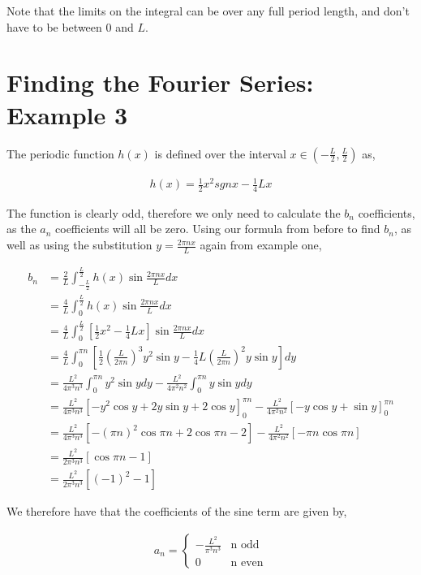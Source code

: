 \documentclass[11pt]{amsart}
\begin{document}
Note that the limits on the integral can be over any full period length, and don't have to be between $0$ and $L$.


\section{Finding the Fourier Series: Example 3}

The periodic function $h(x)$ is defined over the interval $x \in (-\frac{L}{2},\frac{L}{2})$ as,

\begin{align*}
  h(x) = \frac{1}{2}x^2 sgn{x} - \frac{1}{4}Lx
\end{align*}

The function is clearly odd, therefore we only need to calculate the $b_n$ coefficients, as the $a_n$ coefficients will all be zero. Using our formula from before to find $b_n$, as well as using the substitution $y = \frac{2\pi nx}{L}$ again from example one,

\begin{align*}
  b_n &= \frac{2}{L}\int_{-\frac{L}{2}}^{\frac{L}{2}}h(x)\sin{\frac{2\pi nx}{L}} dx \\
      &= \frac{4}{L}\int_0^{\frac{L}{2}}h(x)\sin{\frac{2\pi nx}{L}} dx \\
      &= \frac{4}{L}\int_0^{\frac{L}{2}}\left[\frac{1}{2}x^2-\frac{1}{4}Lx\right]\sin{\frac{2\pi nx}{L}} dx \\
      &= \frac{4}{L}\int_0^{\pi n}\left[\frac{1}{2}{\left(\frac{L}{2\pi n}\right)}^3y^2\sin{y}-\frac{1}{4}L{\left(\frac{L}{2\pi n}\right)}^2y\sin{y}\right] dy \\
      &= \frac{L^2}{4\pi^3n^3}\int_0^{\pi n}y^2\sin{y}dy-\frac{L^2}{4\pi^2n^2}\int_0^{\pi n}y\sin{y}dy \\
      &= \frac{L^2}{4\pi^3n^3}{\left[-y^2\cos{y}+2y\sin{y}+2\cos{y}\right]}_0^{\pi n} - \frac{L^2}{4\pi^2n^2}{\left[-y\cos{y}+\sin{y}\right]}_0^{\pi n} \\
      &= \frac{L^2}{4\pi^3n^3}\left[-{(\pi n)}^2\cos{\pi n}+2\cos{\pi n}-2\right]-\frac{L^2}{4\pi^2n^2}\left[-\pi n\cos{\pi n}\right] \\
      &= \frac{L^2}{2\pi^3n^3}\left[\cos{\pi n}-1\right] \\
      &= \frac{L^2}{2\pi^3n^3}\left[{(-1)}^2-1\right]
\end{align*}

We therefore have that the coefficients of the sine term are given by,

\begin{align*}
  a_n=
  \begin{cases}
    -\frac{L^2}{\pi^3n^3} & \text{n odd} \\
    0 & \text{n even}
  \end{cases}
\end{align*}
\end{document}
